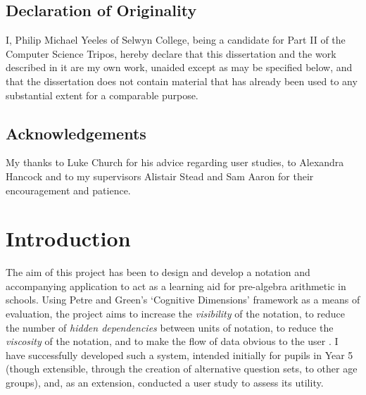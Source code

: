 \documentclass[12pt,twoside,notitlepage,xetex]{report}
\begin{document}
\newpage
\section*{Declaration of Originality}

I, Philip Michael Yeeles of Selwyn College, being a candidate for Part
II of the Computer Science Tripos, hereby declare that this dissertation
and the work described in it are my own work, unaided except as may be
specified below, and that the dissertation does not contain material
that has already been used to any substantial extent for a comparable
purpose.

\bigskip
{}

\medskip
{}

\cleardoublepage

\tableofcontents

\listoffigures

\newpage
\section*{Acknowledgements}
My thanks to Luke Church for his advice regarding user studies, to Alexandra Hancock and to my supervisors Alistair Stead and Sam Aaron for their encouragement and patience.


\cleardoublepage        %

\setcounter{page}{1}
\pagestyle{headings}

\chapter{Introduction}

The aim of this project has been to design and develop a notation and accompanying application to act as a learning aid for pre-algebra arithmetic in schools.  Using Petre and Green's `Cognitive Dimensions' framework as a means of evaluation, the project aims to increase the \emph{visibility} of the notation, to reduce the number of \emph{hidden dependencies} between units of notation, to reduce the \emph{viscosity} of the notation, and to make the flow of data obvious to the user \cite{Green1996}.  I have successfully developed such a system, intended initially for pupils in Year 5 (though extensible, through the creation of alternative question sets, to other age groups), and, as an extension, conducted a user study to assess its utility.
\end{document}
